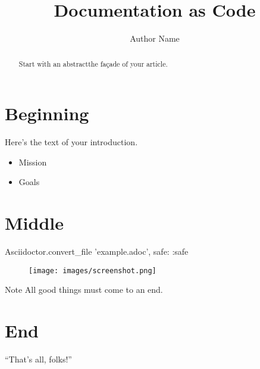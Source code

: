 \documentclass{article}
\begin{document}
\title{Documentation as Code}
\author{Author Name}
\maketitle
\tableofcontents
\begin{abstract}
Start with an abstract\textemdash{}\hspace{0em}the façade of your article.
\end{abstract}
\section{Beginning}
Here's the text of your introduction.
\begin{itemize}
\item{} Mission
\item{} Goals
\end{itemize}
\section{Middle}
\begin{listing1}[language=ruby,firstnumber=1,]
Asciidoctor.convert_file 'example.adoc', safe: :safe
\end{listing1}
\begin{figure}
\centering
\texttt{[image: images/screenshot.png]}
\end{figure}
\begin{DBKadmonition}{}{Note}
All good things must come to an end.
\end{DBKadmonition}
\section{End}
\textquotedblleft{}That's all, folks!\textquotedblright{}
\end{document}
